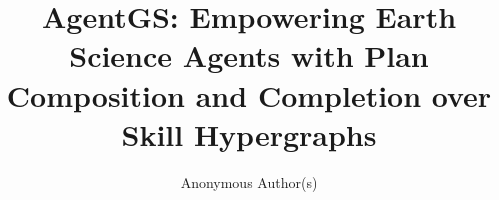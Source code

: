\documentclass[sigconf,anonymous]{aamas}
\title[AgentGS]{AgentGS: Empowering Earth Science Agents with Plan Composition and Completion over Skill Hypergraphs}
\author{Anonymous Author(s)}
\begin{document}
\maketitle









\FloatBarrier

\balance
\nocite{wang2023voyager,liu2024toolnet,liu2024controlllm,lee2025innout}

\end{document}
